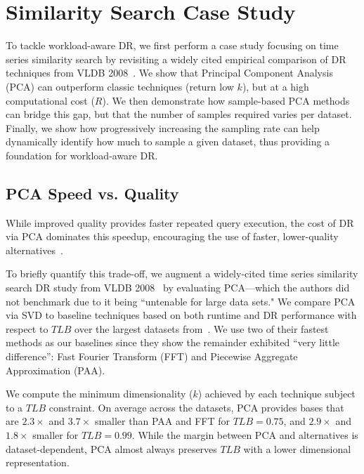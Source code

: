 \section{Similarity Search Case Study}
\label{sec:sampling}

To tackle workload-aware DR, we first perform a case study focusing on time series similarity search by revisiting a widely cited empirical comparison of DR techniques from VLDB 2008~\cite{keogh-study}. 
We show that Principal Component Analysis (PCA) can outperform classic techniques (return low $k$), but at a high computational cost ($R$).
We then demonstrate how sample-based PCA methods can bridge this gap, but that the number of samples required varies per dataset.
Finally, we show how progressively increasing the sampling rate can help dynamically identify how much to sample a given dataset, thus providing a foundation for workload-aware DR.

\subsection{PCA Speed vs. Quality}

While improved quality provides faster repeated query execution, the cost of DR via PCA dominates this speedup, encouraging the use of faster, lower-quality alternatives~\cite{keogh-study}. 

To briefly quantify this trade-off, we augment a widely-cited time series similarity search DR study from VLDB 2008~\cite{keogh-study} by evaluating PCA---which the authors did not benchmark due to it being ``untenable for large data sets." 
We compare PCA via SVD to baseline techniques based on both runtime and DR performance with respect to $TLB$ over the largest datasets from~\cite{keogh-study}. 
We use two of their fastest methods as our baselines since they show the remainder exhibited ``very little difference'': Fast Fourier Transform (FFT) and Piecewise Aggregate Approximation (PAA).


We compute the minimum dimensionality ($k$) achieved by each technique subject to a $TLB$ constraint. 
On average across the datasets, PCA provides bases that are $2.3\times$ and $3.7\times$  smaller than PAA and FFT for $TLB = 0.75$, and $2.9\times$ and $1.8\times$ smaller for $TLB = 0.99$.
While the margin between PCA and alternatives is dataset-dependent, PCA almost always preserves $TLB$ with a lower dimensional representation.

%

